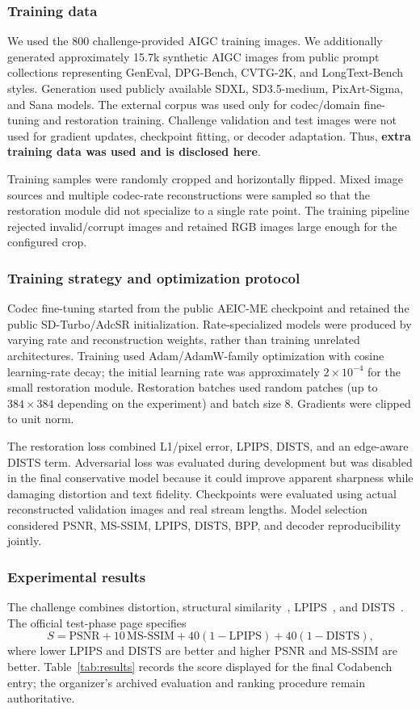 \documentclass[10pt,twocolumn,letterpaper]{article}
\begin{document}
\subsubsection{Training data}
We used the 800 challenge-provided AIGC training images. We additionally generated approximately 15.7k synthetic AIGC images from public prompt collections representing GenEval, DPG-Bench, CVTG-2K, and LongText-Bench styles. Generation used publicly available SDXL, SD3.5-medium, PixArt-Sigma, and Sana models. The external corpus was used only for codec/domain fine-tuning and restoration training. Challenge validation and test images were not used for gradient updates, checkpoint fitting, or decoder adaptation. Thus, \textbf{extra training data was used and is disclosed here}.

Training samples were randomly cropped and horizontally flipped. Mixed image sources and multiple codec-rate reconstructions were sampled so that the restoration module did not specialize to a single rate point. The training pipeline rejected invalid/corrupt images and retained RGB images large enough for the configured crop.

\subsubsection{Training strategy and optimization protocol}
Codec fine-tuning started from the public AEIC-ME checkpoint and retained the public SD-Turbo/AdcSR initialization. Rate-specialized models were produced by varying rate and reconstruction weights, rather than training unrelated architectures. Training used Adam/AdamW-family optimization with cosine learning-rate decay; the initial learning rate was approximately $2\times10^{-4}$ for the small restoration module. Restoration batches used random patches (up to $384\times384$ depending on the experiment) and batch size 8. Gradients were clipped to unit norm.

The restoration loss combined L1/pixel error, LPIPS, DISTS, and an edge-aware DISTS term. Adversarial loss was evaluated during development but was disabled in the final conservative model because it could improve apparent sharpness while damaging distortion and text fidelity. Checkpoints were evaluated using actual reconstructed validation images and real stream lengths. Model selection considered PSNR, MS-SSIM, LPIPS, DISTS, BPP, and decoder reproducibility jointly.

\subsubsection{Experimental results}
The challenge combines distortion, structural similarity~\cite{wang2003msssim}, LPIPS~\cite{zhang2018lpips}, and DISTS~\cite{ding2020dists}. The official test-phase page specifies
\begin{equation}
S=\mathrm{PSNR}+10\,\mathrm{MS\mbox{-}SSIM}+40(1-\mathrm{LPIPS})+40(1-\mathrm{DISTS}),
\end{equation}
where lower LPIPS and DISTS are better and higher PSNR and MS-SSIM are better. Table~\ref{tab:results} records the score displayed for the final Codabench entry; the organizer's archived evaluation and ranking procedure remain authoritative.
\end{document}
